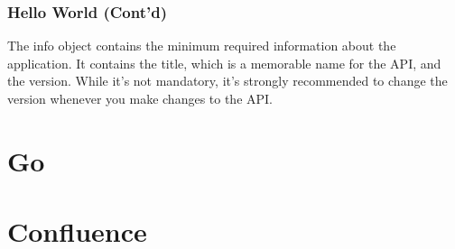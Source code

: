 \documentclass{efd-lecture}
\begin{document}
\begin{frame}[fragile]
  \frametitle{Hello World (Cont'd)}
  \begin{block}{}
    The info object contains the minimum required information about the application.
    It contains the title, which is a memorable name for the API, and the version. While it's not mandatory,
    it's strongly recommended to change the version whenever you make changes to the API\@.
  \end{block}
\end{frame}

\section{Go}

\section{Confluence}
\end{document}
